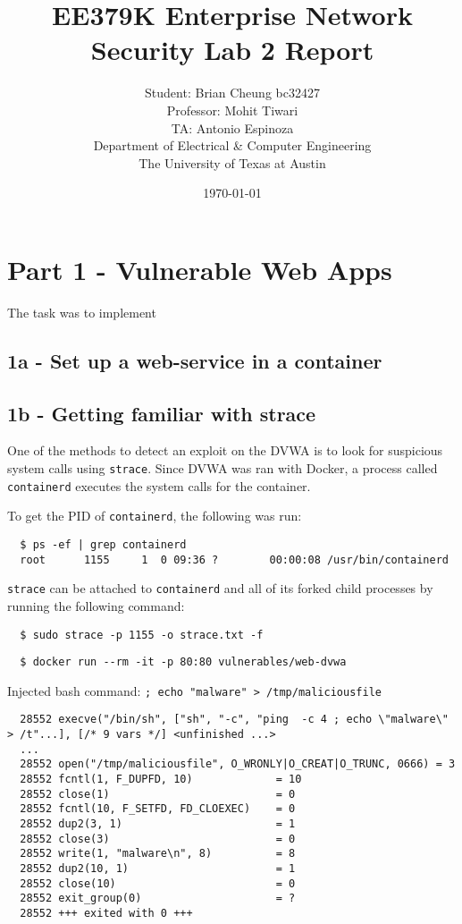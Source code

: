 \documentclass[11pt]{article}
\author{Student: Brian Cheung bc32427 \\ Professor: Mohit Tiwari \\ TA: Antonio Espinoza \\ Department of Electrical \& Computer Engineering \\ The University of Texas at Austin}
\date{\today}
\title{EE379K Enterprise Network Security Lab 2 Report}
\begin{document}
\maketitle
\newpage
\section*{Part 1 - Vulnerable Web Apps}
\label{sec:part-1}
The task was to implement
\subsection*{1a - Set up a web-service in a container}

\subsection*{1b - Getting familiar with strace}
One of the methods to detect an exploit on the DVWA is to look for suspicious system calls using \verb|strace|.
Since DVWA was ran with Docker, a process called \verb|containerd| executes the system calls for the container.

\noindent To get the PID of \verb|containerd|, the following was run:
\begin{verbatim}
  $ ps -ef | grep containerd
  root      1155     1  0 09:36 ?        00:00:08 /usr/bin/containerd
\end{verbatim}

\noindent \verb|strace| can be attached to \verb|containerd| and all of its forked child processes by running the following command:
\begin{verbatim}
  $ sudo strace -p 1155 -o strace.txt -f
\end{verbatim}

\begin{verbatim}
  $ docker run --rm -it -p 80:80 vulnerables/web-dvwa
\end{verbatim}

\noindent Injected bash command:
\verb|; echo "malware" > /tmp/maliciousfile|

\begin{verbatim}
  28552 execve("/bin/sh", ["sh", "-c", "ping  -c 4 ; echo \"malware\" > /t"...], [/* 9 vars */] <unfinished ...>
  ...
  28552 open("/tmp/maliciousfile", O_WRONLY|O_CREAT|O_TRUNC, 0666) = 3
  28552 fcntl(1, F_DUPFD, 10)             = 10
  28552 close(1)                          = 0
  28552 fcntl(10, F_SETFD, FD_CLOEXEC)    = 0
  28552 dup2(3, 1)                        = 1
  28552 close(3)                          = 0
  28552 write(1, "malware\n", 8)          = 8
  28552 dup2(10, 1)                       = 1
  28552 close(10)                         = 0
  28552 exit_group(0)                     = ?
  28552 +++ exited with 0 +++
\end{verbatim}
\end{document}

